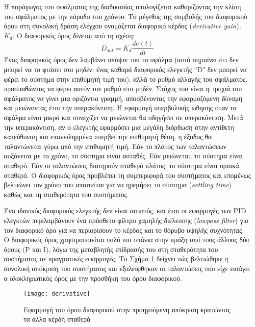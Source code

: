 Η παράγωγος του σφάλματος της διαδικασίας υπολογίζεται καθορίζοντας την κλίση του σφάλματος με την πάροδο του χρόνου. Το μέγεθος της συμβολής του διαφορικού όρου στη συνολική δράση ελέγχου ονομάζεται διαφορικό κέρδος (\emph{derivative gain}), $K_d$. Ο διαφορικός όρος δίνεται από τη σχέση:
\begin{equation}
D_{out}=K_d \frac{de(t)}{dt}
\label{eq:dout}
\end{equation}
Ένας διαφορικός όρος δεν λαμβάνει υπόψιν του το σφάλμα (αυτό σημαίνει ότι δεν μπορεί να το φτάσει στο μηδέν: ένας καθαρά διαφορικός ελεγκτής ``D" δεν μπορεί να φέρει το σύστημα στην επιθυμητή τιμή του), αλλά το ρυθμό αλλαγής του σφάλματος, προσπαθώντας να φέρει αυτόν τον ρυθμό στο μηδέν. Στόχος του είναι η τροχιά του σφάλματος να γίνει μια οριζόντια γραμμή, αποσβένοντας την εφαρμοζόμενη δύναμη και μειώνοντας έτσι την υπερακόντιση. Η εφαρμογή υπερβολικής ώθησης όταν το σφάλμα είναι μικρό και συνεχίζει να μειώνεται θα οδηγήσει σε υπερακόντιση. Μετά την υπερακόντιση, αν ο ελεγκτής εφαρμόσει μια μεγάλη διόρθωση στην αντίθετη κατεύθυνση και επανειλημμένα υπερβεί την επιθυμητή θέση, η έξοδος θα ταλαντώνεται γύρω από την επιθυμητή τιμή. Εάν το πλάτος των ταλαντώσεων αυξάνεται με το χρόνο, το σύστημα είναι ασταθές. Εάν μειώνεται, το σύστημα είναι σταθερό. Εάν οι ταλαντώσεις διατηρούν σταθερό πλάτος, το σύστημα είναι οριακά σταθερό. Ο διαφορικός όρος προβλέπει τη συμπεριφορά του συστήματος και επομένως βελτιώνει τον χρόνο που απαιτείται για να ηρεμήσει το σύστημα (\emph{settling time}) καθώς και τη σταθερότητα του συστήματος.

Ένα ιδανικός διαφορικός ελεγκτής δεν είναι αιτιατός, και έτσι οι εφαρμογές των PID ελεγκτών περιλαμβάνουν ένα πρόσθετο φίλτρο χαμηλής διέλευσης (\emph{lowpass filter}) για τον διαφορικό όρο για να περιορίσουν το κέρδος και το θόρυβο υψηλής συχνότητας. Ο διαφορικός όρος χρησιμοποιείται πολύ πιο σπάνια στην πράξη από τους άλλους δύο όρους (P και I), λόγω της μεταβλητής επίδρασής του στη σταθερότητα του συστήματος σε πραγματικές εφαρμογές. Το Σχήμα \ref{fig:derivative} δείχνει πώς βελτιώθηκε η συνολική απόκριση του συστήματος και εξαλείφθηκαν οι ταλαντώσεις που είχε εισάγει ο ολοκληρωτικός όρος με την προσθήκη του όρου διαφορικού.

\begin{figure}[h]
  \centering
  \texttt{[image: derivative]}
  \caption{Εφαρμογή του όρου διαφορικού στην προηγούμενη απόκριση κρατώντας τα άλλα κέρδη σταθερά}
  \label{fig:derivative}
\end{figure}

